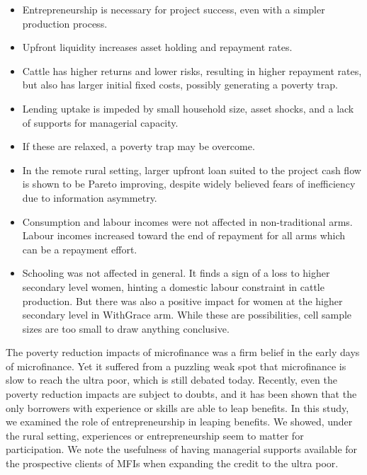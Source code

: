 \begin{mdframed}[style={SecItemize}, frametitle={Conclusion}]
\begin{itemize}
\vspace{1.0ex}\setlength{\itemsep}{1.0ex}\setlength{\baselineskip}{12pt}
\item	Entrepreneurship is necessary for project success, even with a simpler production process.
\item	Upfront liquidity increases asset holding and repayment rates.
\item	Cattle has higher returns and lower risks, resulting in higher repayment rates, but also has larger initial fixed costs, possibly generating a poverty trap.
\item	Lending uptake is impeded by small household size, asset shocks, and a lack of supports for managerial capacity.
\item	If these are relaxed, a poverty trap may be overcome.
\item	In the remote rural setting, larger upfront loan suited to the project cash flow is shown to be Pareto improving, despite widely believed fears of inefficiency due to information asymmetry.
\item	Consumption and labour incomes were not affected in non-\textsf{traditional} arms. Labour incomes increased toward the end of repayment for all arms which can be a repayment effort.
\item	Schooling was not affected in general. It finds a sign of a loss to higher secondary level women, hinting a domestic labour constraint in cattle production. But there was also a positive impact for women at the higher secondary level in \textsf{WithGrace} arm. While these are possibilities, cell sample sizes are too small to draw anything conclusive.
\end{itemize}
\end{mdframed}

	The poverty reduction impacts of microfinance was a firm belief in the early days of microfinance. Yet it suffered from a puzzling weak spot that microfinance is slow to reach the ultra poor, which is still debated today. Recently, even the poverty reduction impacts are subject to doubts, and it has been shown that the only borrowers with experience or skills are able to leap benefits. In this study, we examined the role of entrepreneurship in leaping benefits. We showed, under the rural setting, experiences or entrepreneurship seem to matter for participation. We note the usefulness of having managerial supports available for the prospective clients of MFIs when expanding the credit to the ultra poor. 

